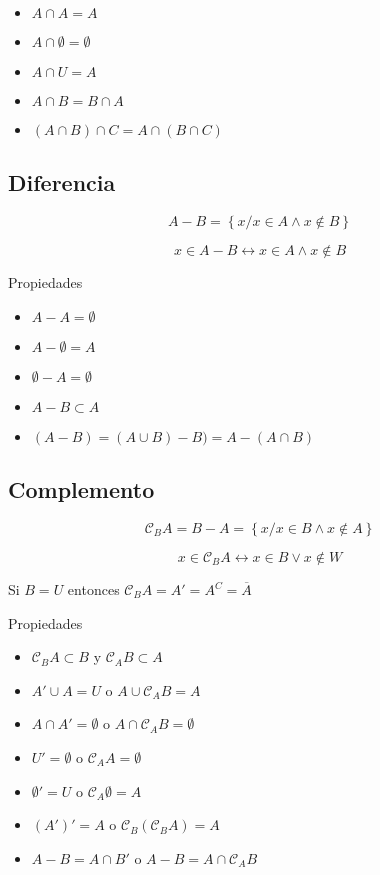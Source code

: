 \documentclass[16pt,]{krantz}
\providecommand{\tightlist}{%
  \setlength{\itemsep}{0pt}\setlength{\parskip}{0pt}}
\theoremstyle{definition}
\theoremstyle{definition}
\theoremstyle{definition}
\theoremstyle{definition}
\theoremstyle{remark}
\begin{document}
\begin{itemize}
\tightlist
\item
  \(A\cap A=A\)
\item
  \(A\cap \emptyset=\emptyset\)
\item
  \(A\cap U=A\)
\item
  \(A\cap B=B\cap A\)
\item
  \((A\cap B)\cap C=A\cap(B\cap C)\)
\end{itemize}

\hypertarget{diferencia}{%
\subsection{Diferencia}\label{diferencia}}

\[
A- B=\left\{x/x\in A\wedge x\notin B\right\}
\]

\[
x\in A- B\leftrightarrow x\in A\wedge x\notin B
\]

Propiedades

\begin{itemize}
\tightlist
\item
  \(A- A=\emptyset\)
\item
  \(A- \emptyset=A\)
\item
  \(\emptyset-A=\emptyset\)
\item
  \(A- B\subset A\)
\item
  \((A-B)=(A\cup B)-B)=A-(A\cap B)\)
\end{itemize}

\hypertarget{complemento}{%
\subsection{Complemento}\label{complemento}}

\[
\mathcal{C}_BA=B-A=\left\{x/x\in B\wedge x\notin A\right\}
\]

\[
x\in \mathcal{C}_BA\leftrightarrow x\in B\vee x\notin W
\]

Si \(B=U\) entonces \(\mathcal{C}_BA=A'=A^C=\overline{A}\)

Propiedades

\begin{itemize}
\tightlist
\item
  \(\mathcal{C}_BA\subset B\) y \(\mathcal{C}_AB\subset A\)
\item
  \(A'\cup A=U\) o \(A\cup \mathcal{C}_AB=A\)
\item
  \(A\cap A'=\emptyset\) o \(A\cap \mathcal{C}_AB=\emptyset\)
\item
  \(U'=\emptyset\) o \(\mathcal{C}_AA=\emptyset\)
\item
  \(\emptyset'=U\) o \(\mathcal{C}_A\emptyset=A\)
\item
  \((A')'=A\) o \(\mathcal{C}_B(\mathcal{C}_BA)=A\)
\item
  \(A-B=A\cap B'\) o \(A-B=A\cap \mathcal{C}_AB\)
\end{itemize}
\end{document}
